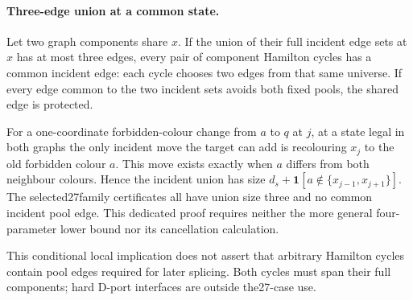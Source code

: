 \paragraph{Three-edge union at a common state.}
Let two graph components share $x$. If the union of their full incident
edge sets at $x$ has at most three edges, every pair of component Hamilton
cycles has a common incident edge: each cycle chooses two edges from that
same universe. If every edge common to the two incident sets avoids both
fixed pools, the shared edge is protected.

For a one-coordinate forbidden-colour change from $a$ to $q$ at $j$,
at a state legal in both graphs the only incident move the target can add
is recolouring $x_j$ to the old forbidden colour $a$. This move exists
exactly when $a$ differs from both neighbour colours. Hence the incident
union has size $d_s+\mathbf1[a\notin\{x_{j-1},x_{j+1}\}]$.
The selected27family certificates all have union size three and no common
incident pool edge. This dedicated proof requires neither the more general
four-parameter lower bound nor its cancellation calculation.

This conditional local implication does not assert that arbitrary Hamilton
cycles contain pool edges required for later splicing. Both cycles must span
their full components; hard D-port interfaces are outside the27-case use.
